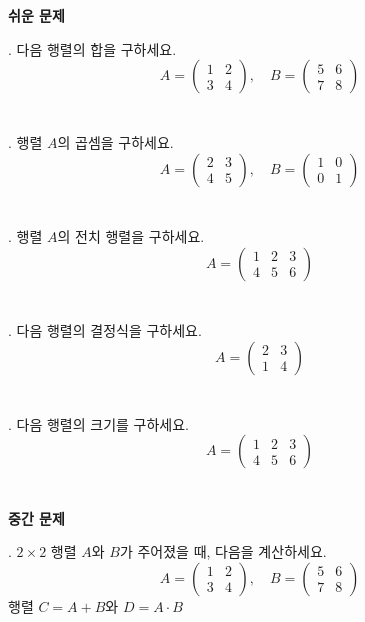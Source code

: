\documentclass[fleqn]{article}
\begin{document}
      
        \textbf{쉬운 문제}

. 다음 행렬의 합을 구하세요. 
\[
A = \begin{pmatrix}
1 & 2 \\
3 & 4
\end{pmatrix}, \quad B = \begin{pmatrix}
5 & 6 \\
7 & 8
\end{pmatrix}
\] 
\ \\\\

. 행렬 \(A\)의 곱셈을 구하세요.
\[
A = \begin{pmatrix}
2 & 3 \\
4 & 5
\end{pmatrix}, \quad B = \begin{pmatrix}
1 & 0 \\
0 & 1
\end{pmatrix}
\]
\ \\\\

. 행렬 \(A\)의 전치 행렬을 구하세요.
\[
A = \begin{pmatrix}
1 & 2 & 3 \\
4 & 5 & 6
\end{pmatrix}
\]
\ \\\\

. 다음 행렬의 결정식을 구하세요.
\[
A = \begin{pmatrix}
2 & 3 \\
1 & 4
\end{pmatrix}
\]
\ \\\\

. 다음 행렬의 크기를 구하세요.
\[
A = \begin{pmatrix}
1 & 2 & 3 \\
4 & 5 & 6
\end{pmatrix}
\]
\ \\\\

\textbf{중간 문제}

. \(2 \times 2\) 행렬 \(A\)와 \(B\)가 주어졌을 때, 다음을 계산하세요.
\[
A = \begin{pmatrix}
1 & 2 \\
3 & 4
\end{pmatrix}, \quad B = \begin{pmatrix}
5 & 6 \\
7 & 8
\end{pmatrix}
\]
행렬 \(C = A + B\)와 \(D = A \cdot B\) 
\ \\\\
\end{document}
